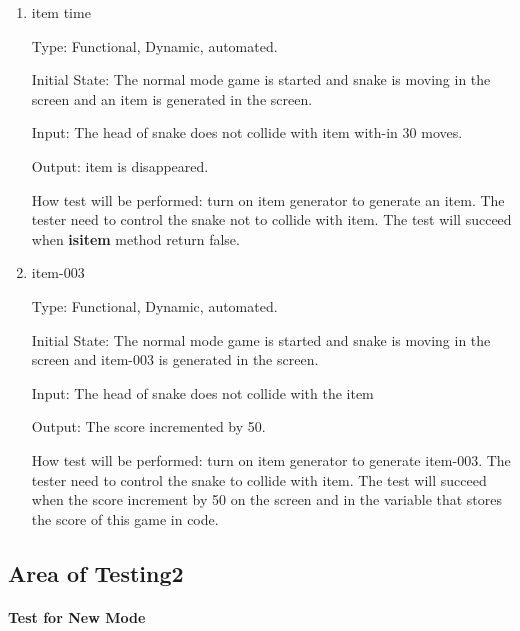 \documentclass[12pt, titlepage]{article}
\begin{document}
\begin{enumerate}
\item{item time\\}

Type: Functional, Dynamic, automated.
					
Initial State: The normal mode game is started and snake is moving in the screen and an item is generated in the screen.
					
Input: The head of snake does not collide with item with-in 30 moves.
					
Output: item is disappeared.
					
How test will be performed: turn on item generator to generate an item. The tester need to control the snake not to collide with item. The test will succeed when \textbf{isitem} method return false.

\item{item-003\\}

Type: Functional, Dynamic, automated.
					
Initial State: The normal mode game is started and snake is moving in the screen and item-003 is generated in the screen.
					
Input: The head of snake does not collide with the item
					
Output: The score incremented by 50.
					
How test will be performed: turn on item generator to generate item-003. The tester need to control the snake to collide with item. The test will succeed when the score increment by 50 on the screen and in the variable that stores the score of this game in code.

\end{enumerate}

\subsection{Area of Testing2}

\paragraph{Test for New Mode}
\end{document}
